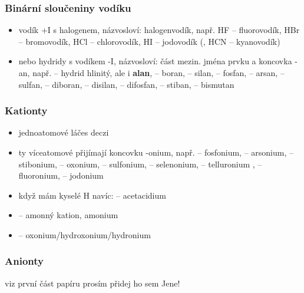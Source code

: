 \documentclass{article}
\begin{document}
\subsubsection{Binární sloučeniny vodíku}
\begin{itemize}
  \item vodík +I s halogenem, názvosloví: halogenvodík, např. HF -- fluorovodík, HBr -- bromovodík, HCl -- chlorovodík, HI -- jodovodík (, HCN -- kyanovodík)
  \item nebo hydridy s vodíkem -I, názvosloví: část mezin. jména prvku a koncovka -an, např.  -- hydrid hlinitý, ale i \textbf{alan},  -- boran,  -- silan,  -- fosfan,  -- arsan,  -- sulfan,  -- diboran,  -- disilan,  -- difosfan,  -- stiban,  -- bismutan
\end{itemize}

\subsubsection{Kationty}
\begin{itemize}
  \item jednoatomové láčes deczi
  \item ty víceatomové přijímají koncovku -onium, např.  -- fosfonium,  -- arsonium,  -- stibonium,  -- oxonium,  -- sulfonium,  -- selenonium,  -- telluronium ,  -- fluoronium,  -- jodonium
  \item když mám kyselé H navíc:  -- acetacidium
  \item {} -- amonný kation, amonium
  \item {} -- oxonium/hydroxonium/hydronium
\end{itemize}

\subsubsection{Anionty}
viz první část papíru prosím přidej ho sem Jene!
\end{document}
